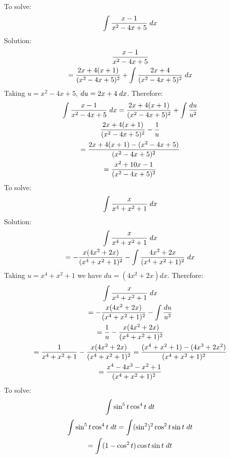 \documentclass{article}
\begin{document}
  To solve:
  $$\int \frac{x-1}{x^2-4x+5}\hspace{1mm}dx$$
  Solution:
  \begin{gather*}
      \frac{x-1}{x^2-4x+5}
      \\=\frac{2x+4(x+1)}{(x^2-4x+5)^2}+\int \frac{2x+4}{(x^2-4x+5)^2} \hspace{1mm} dx
  \end{gather*}
  Taking $u=x^2-4x+5$, $du=2x+4\hspace{1mm}dx$. Therefore:
\begin{gather*}
    \int \frac{x-1}{x^2-4x+5}\hspace{1mm}dx=\frac{2x+4(x+1)}{(x^2-4x+5)^2}+\int \frac{du}{u^2}
    \\\frac{2x+4(x+1)}{(x^2-4x+5)^2}-\frac{1}{u}
    \\=\frac{2x+4(x+1)-(x^2-4x+5)}{(x^2-4x+5)^2}
    \\=\frac{x^2+10x-1}{(x^2-4x+5)^2}
\end{gather*}
To solve:
$$\int \frac{x}{x^4+x^2+1} \hspace{1mm} dx$$
Solution:
\begin{gather*}
   \int \frac{x}{x^4+x^2+1} \hspace{1mm} dx
   \\= -\frac{x(4x^2+2x)}{(x^4+x^2+1)^2} - \int \frac{4x^2+2x}{(x^4+x^2+1)^2} \hspace{1mm}{dx}
\end{gather*}
Taking $u=x^4+x^2+1$ we have $du=(4x^2+2x)dx$. Therefore:
\begin{gather*}
\int \frac{x}{x^4+x^2+1} \hspace{1mm} dx
\\=-\frac{x(4x^2+2x)}{(x^4+x^2+1)^2} - \int \frac{du}{u^2}
\\=\frac{1}{u}-\frac{x(4x^2+2x)}{(x^4+x^2+1)^2}
\\=\frac{1}{x^4+x^2+1}-\frac{x(4x^2+2x)}{(x^4+x^2+1)^2}
=\frac{(x^4+x^2+1)-(4x^3+2x^2)}{(x^4+x^2+1)^2}
\\=\frac{x^4-4x^3-x^2+1}{(x^4+x^2+1)^2}
\end{gather*}
\newpage To solve:
$$\int \sin^5 t \cos^4t\hspace{1mm}dt$$
\begin{gather*}
 \int \sin^5 t \cos^4t\hspace{1mm}dt=\int (\sin^2)^2\cos^2 t \sin t \hspace{1mm} dt
 \\=\int (1-\cos^2 t)\cos t \sin t \hspace{1mm} dt
\end{gather*}
\end{document}
